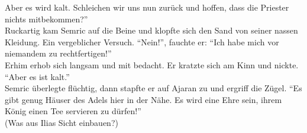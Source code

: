 Aber es wird kalt. Schleichen wir uns nun zurück und hoffen, dass die Priester nichts 
mitbekommen?''\\
Ruckartig kam Semric auf die Beine und klopfte sich den Sand von seiner nassen Kleidung. Ein 
vergeblicher Versuch. ``Nein!'', fauchte er: ``Ich habe mich vor niemandem zu rechtfertigen!''\\
Erhim erhob sich langsam und mit bedacht. Er kratzte sich am Kinn und nickte. ``Aber es ist 
kalt.''\\
Semric überlegte flüchtig, dann stapfte er auf Ajaran zu und ergriff die Zügel. ``Es gibt genug 
Häuser des Adels hier in der Nähe. Es wird eine Ehre sein, ihrem König einen Tee servieren zu 
dürfen!''\\

(Was aus Ilias Sicht einbauen?)

